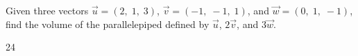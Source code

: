 
\begin{Exercise}[
name={},
title={}, 
difficulty=0,
origin={\cite{MB}}]
Given three vectors $\vec{u}=(2,\;1,\;3)$, $\vec{v}=(-1,\;-1,\;1)$, and $\vec{w}=(0,\;1,\;-1)$, find the volume of the parallelepiped defined by $\vec{u}$, $2\vec{v}$, and $3\vec{w}$.
\end{Exercise}

\begin{Answer}
24
\end{Answer}
